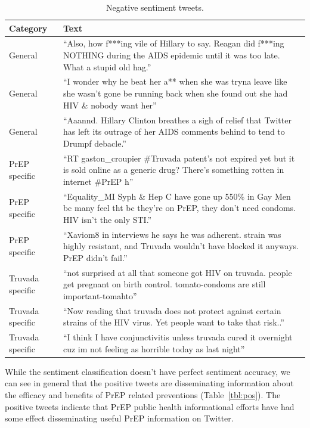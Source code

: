 \documentclass[conference]{IEEEtran}
\begin{document}
\begin{table}
\centering
\caption{Negative sentiment tweets.}
\begin{tabular}{|p{2.5cm}|p{12cm}|} \hline
Category & Text\\ \hline
General & ``Also, how f***ing vile of Hillary to say. Reagan did f***ing NOTHING during the AIDS epidemic until it was too late. What a stupid old hag.''\\ \hline
General & ``I wonder why he beat her a** when she was tryna leave like she wasn't gone be running back when she found out she had HIV \& nobody want her''\\ \hline
General & ``Aaannd. Hillary Clinton breathes a sigh of relief that Twitter has left its outrage of her AIDS comments behind to tend to Drumpf debacle.''\\ \hline

PrEP specific & ``RT gaston\_croupier \#Truvada patent's not expired yet but it is sold online as a generic drug? There's something rotten in internet \#PrEP h''\\ \hline
PrEP specific & ``Equality\_MI Syph \& Hep C have gone up 550\% in Gay Men bc many feel tht bc they're on PrEP, they don't need condoms. HIV isn't the only STI.''\\ \hline
PrEP specific & ``Xaviom8 in interviews he says he was adherent. strain was highly resistant, and Truvada wouldn't have blocked it anyways. PrEP didn't fail.''\\ \hline

Truvada specific & ``not surprised at all that someone got HIV on truvada. people get pregnant on birth control. tomato-condoms are still important-tomahto''\\ \hline
Truvada specific & ``Now reading that truvada does not protect against certain strains of the HIV virus. Yet people want to take that risk..''\\ \hline
Truvada specific & ``I think I have conjunctivitis unless truvada cured it overnight cuz im not feeling as horrible today as last night''\\ \hline

\hline\end{tabular}
\label{tbl:neg}
\end{table}

While the sentiment classification doesn't have perfect sentiment accuracy, we can see in general that the positive tweets are disseminating information about the efficacy and benefits of PrEP related preventions (Table~\ref{tbl:pos}). The positive tweets indicate that PrEP public health informational efforts have had some effect disseminating useful PrEP information on Twitter. 
\end{document}

